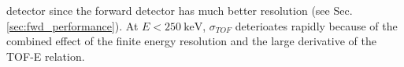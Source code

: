 \documentclass[number,5p]{elsarticle}
\begin{document}
detector since the forward detector has much better resolution (see Sec. \ref{sec:fwd_performance}).
At $E < \SI{250}{\keV}$, $\sigma_{TOF}$ deterioates rapidly because of the
combined effect of the finite energy resolution and the large derivative of the TOF-E relation.
\end{document}
